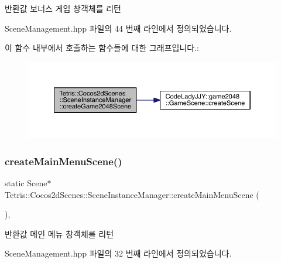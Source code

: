 \begin{DoxyReturn}{반환값}
보너스 게임 창객체를 리턴 
\end{DoxyReturn}


Scene\+Management.\+hpp 파일의 44 번째 라인에서 정의되었습니다.

이 함수 내부에서 호출하는 함수들에 대한 그래프입니다.\+:
\nopagebreak
\begin{figure}[H]
\begin{center}
\leavevmode
\includegraphics[width=350pt]{class_tetris_1_1_cocos2d_scenes_1_1_scene_instance_manager_a271e373f7a835b2e8dcec0a69be4f849_cgraph}
\end{center}
\end{figure}
\mbox{\label{class_tetris_1_1_cocos2d_scenes_1_1_scene_instance_manager_a7dad1373db969d5c882e2cdc46f7933a}} 
\subsubsection{\texorpdfstring{create\+Main\+Menu\+Scene()}{createMainMenuScene()}}
{\footnotesize\ttfamily static Scene$\ast$ Tetris\+::\+Cocos2d\+Scenes\+::\+Scene\+Instance\+Manager\+::create\+Main\+Menu\+Scene (\begin{DoxyParamCaption}{ }\end{DoxyParamCaption})\hspace{0.3cm}{\ttfamily [inline]}, {\ttfamily [static]}}

\begin{DoxyReturn}{반환값}
메인 메뉴 창객체를 리턴 
\end{DoxyReturn}


Scene\+Management.\+hpp 파일의 32 번째 라인에서 정의되었습니다.

